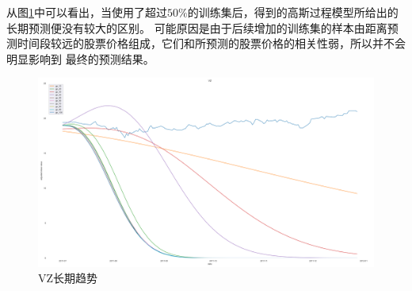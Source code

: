 从图\ref{2lab2VZtrend}中可以看出，当使用了超过$50\%$的训练集后，得到的高斯过程模型所给出的长期预测便没有较大的区别。
可能原因是由于后续增加的训练集的样本由距离预测时间段较远的股票价格组成，它们和所预测的股票价格的相关性弱，所以并不会明显影响到
最终的预测结果。

\begin{figure}[!htbp]
    \centering
    \includegraphics[width=\textwidth]{images/lab2/VZ_trend.png}
    \caption{VZ长期趋势}\label{2lab2VZtrend}
\end{figure}

